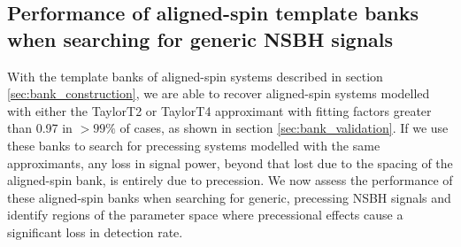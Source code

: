 \subsection{Performance of aligned-spin template banks when searching for 
generic NSBH signals}
\label{sec:aligned_spin}

With the template banks of aligned-spin systems described in section
\ref{sec:bank_construction}, we are able to recover aligned-spin systems
modelled with either the TaylorT2 or TaylorT4 approximant with fitting factors
greater than 0.97 in $>99\%$ of cases, as shown in section
\ref{sec:bank_validation}.
If we use these banks to search for precessing systems modelled with the same
approximants, any loss in signal power, beyond that lost due to the spacing of
the aligned-spin bank, is entirely due to precession.
We now assess the performance of these aligned-spin banks when searching for
generic, precessing \ac{NSBH} signals and identify regions of the
parameter space where precessional effects cause a significant loss in
detection rate.

